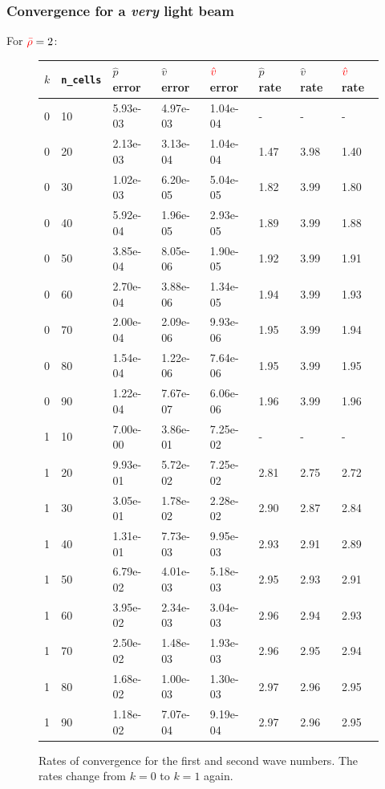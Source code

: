 \documentclass[8pt]{beamer}
\newcommand{\leftd}[1]{{\color{red} \bar{#1}}}
\newcommand{\leftFourier}[1]{{\color{red} \hat{#1}}}
\begin{document}
\begin{frame}
    \frametitle{Convergence for a \emph{very} light beam}
    For \(\leftd{\rho} = 2\):
    \begin{figure}
        \centering
        \begin{tabular}{| l | l | l | l | l | l | l | l |}
            \hline
            \(k\) & \texttt{n\_cells} &
            \(\hat{p}\) error & \(\hat{v}\) error & \(\leftFourier{v}\) error &
            \(\hat{p}\) rate & \(\hat{v}\) rate & \(\leftFourier{v}\) rate    \\
            \hline
            0 & 10 & 5.93e-03 & 4.97e-03 & 1.04e-04 & -    & -    & -         \\
            0 & 20 & 2.13e-03 & 3.13e-04 & 1.04e-04 & 1.47 & 3.98 & 1.40      \\
            0 & 30 & 1.02e-03 & 6.20e-05 & 5.04e-05 & 1.82 & 3.99 & 1.80      \\
            0 & 40 & 5.92e-04 & 1.96e-05 & 2.93e-05 & 1.89 & 3.99 & 1.88      \\
            0 & 50 & 3.85e-04 & 8.05e-06 & 1.90e-05 & 1.92 & 3.99 & 1.91      \\
            0 & 60 & 2.70e-04 & 3.88e-06 & 1.34e-05 & 1.94 & 3.99 & 1.93      \\
            0 & 70 & 2.00e-04 & 2.09e-06 & 9.93e-06 & 1.95 & 3.99 & 1.94      \\
            0 & 80 & 1.54e-04 & 1.22e-06 & 7.64e-06 & 1.95 & 3.99 & 1.95      \\
            0 & 90 & 1.22e-04 & 7.67e-07 & 6.06e-06 & 1.96 & 3.99 & 1.96      \\
            \hline
            1 & 10 & 7.00e-00 & 3.86e-01 & 7.25e-02 & -    & -    & -         \\
            1 & 20 & 9.93e-01 & 5.72e-02 & 7.25e-02 & 2.81 & 2.75 & 2.72      \\
            1 & 30 & 3.05e-01 & 1.78e-02 & 2.28e-02 & 2.90 & 2.87 & 2.84      \\
            1 & 40 & 1.31e-01 & 7.73e-03 & 9.95e-03 & 2.93 & 2.91 & 2.89      \\
            1 & 50 & 6.79e-02 & 4.01e-03 & 5.18e-03 & 2.95 & 2.93 & 2.91      \\
            1 & 60 & 3.95e-02 & 2.34e-03 & 3.04e-03 & 2.96 & 2.94 & 2.93      \\
            1 & 70 & 2.50e-02 & 1.48e-03 & 1.93e-03 & 2.96 & 2.95 & 2.94      \\
            1 & 80 & 1.68e-02 & 1.00e-03 & 1.30e-03 & 2.97 & 2.96 & 2.95      \\
            1 & 90 & 1.18e-02 & 7.07e-04 & 9.19e-04 & 2.97 & 2.96 & 2.95      \\
            \hline
        \end{tabular}
        \caption{Rates of convergence for the first and second wave numbers. The
        rates change from \(k = 0\) to \(k = 1\) again.}
    \end{figure}
\end{frame}
\end{document}

